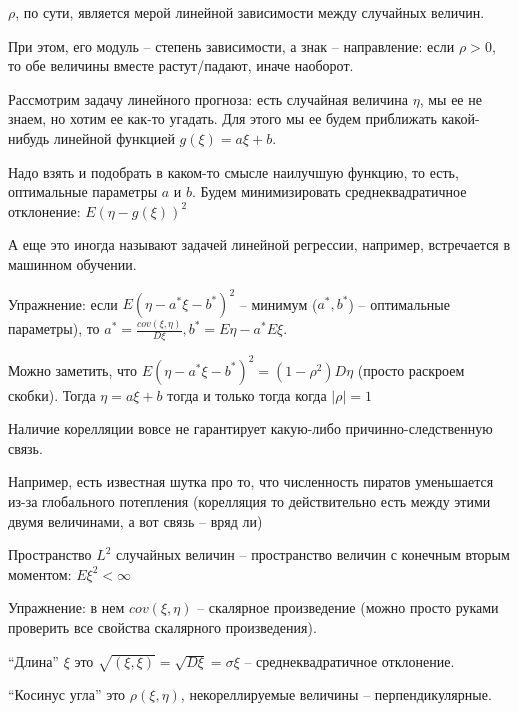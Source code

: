 \begin{Rem}

    $\rho$, по сути, является мерой линейной зависимости между случайных величин. 

    При этом, его модуль -- степень зависимости, а знак -- направление: если $\rho > 0$, то обе величины вместе растут/падают, иначе наоборот.
\end{Rem}

Рассмотрим задачу линейного прогноза: есть случайная величина $\eta$, мы ее не знаем, но хотим ее как-то угадать.
Для этого мы ее будем приближать какой-нибудь линейной функцией $g(\xi) = a\xi + b$. 

Надо взять и подобрать в каком-то смысле наилучшую функцию, то есть, оптимальные параметры $a$ и $b$. 
Будем минимизировать среднеквадратичное отклонение: $E(\eta - g(\xi))^2$
\begin{Rem}
А еще это иногда называют задачей линейной регрессии, например, встречается в машинном обучении.
\end{Rem}

Упражнение: если $E(\eta - a^*\xi -b^*)^2$ -- минимум ($a^*, b^*$) -- оптимальные параметры), то $a^* = \frac{cov(\xi, \eta)}{D\xi}, b^* = E\eta - a^*E\xi$.

Можно заметить, что $E(\eta - a^*\xi -b^*)^2 = (1 - \rho^2) D\eta$ (просто раскроем скобки). Тогда $\eta =  a\xi + b$ тогда и только тогда когда $|\rho| = 1$

\begin{Rem}
Наличие корелляции вовсе не гарантирует какую-либо причинно-следственную связь. 

Например, есть известная шутка про то, что численность пиратов уменьшается из-за глобального потепления (корелляция то действительно есть между этими двумя величинами, а вот связь -- вряд ли) 
\end{Rem}

\begin{Def}
Пространство $L^2$ случайных величин -- пространство величин с конечным вторым моментом: $E \xi^2 < \infty$
\end{Def}

Упражнение: в нем $cov(\xi, \eta)$ -- скалярное произведение (можно просто руками проверить все свойства скалярного произведения).

``Длина'' $\xi$ это $\sqrt{(\xi, \xi)} = \sqrt{D\xi} = \sigma \xi$ -- среднеквадратичное отклонение.

``Косинус угла'' это $\rho(\xi, \eta)$, некореллируемые величины -- перпендикулярные.


